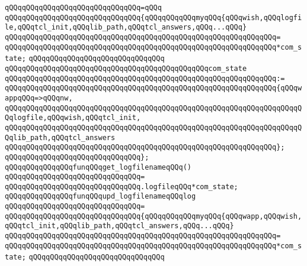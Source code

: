 \verb|qQQqqQQqqQQqqQQqqQQqqQQqqQQqqQQq=qQQq|\newline
\verb|qQQqqQQqqQQqqQQqqQQqqQQqqQQqqQQq{qQQqqQQqqQQqmyqQQq{qQQqwish,qQQqlogfile,qQQqtcl_init,qQQqlib_path,qQQqtcl_answers,qQQq...qQQq}|\newline
\verb|qQQqqQQqqQQqqQQqqQQqqQQqqQQqqQQqqQQqqQQqqQQqqQQqqQQqqQQqqQQqqQQq=|\newline
\verb|qQQqqQQqqQQqqQQqqQQqqQQqqQQqqQQqqQQqqQQqqQQqqQQqqQQqqQQqqQQqqQQq*com_state;|\newline
\verb|qQQqqQQqqQQqqQQqqQQqqQQqqQQqqQQq|\newline
\verb|qQQqqQQqqQQqqQQqqQQqqQQqqQQqqQQqqQQqqQQqqQQqqQQqcom_state|\newline
\verb|qQQqqQQqqQQqqQQqqQQqqQQqqQQqqQQqqQQqqQQqqQQqqQQqqQQqqQQqqQQqqQQq:=|\newline
\verb|qQQqqQQqqQQqqQQqqQQqqQQqqQQqqQQqqQQqqQQqqQQqqQQqqQQqqQQqqQQqqQQq{qQQqwappqQQq=>qQQqnw,|\newline
\verb|qQQqqQQqqQQqqQQqqQQqqQQqqQQqqQQqqQQqqQQqqQQqqQQqqQQqqQQqqQQqqQQqqQQqqQQqlogfile,qQQqwish,qQQqtcl_init,|\newline
\verb|qQQqqQQqqQQqqQQqqQQqqQQqqQQqqQQqqQQqqQQqqQQqqQQqqQQqqQQqqQQqqQQqqQQqqQQqlib_path,qQQqtcl_answers|\newline
\verb|qQQqqQQqqQQqqQQqqQQqqQQqqQQqqQQqqQQqqQQqqQQqqQQqqQQqqQQqqQQqqQQq};|\newline
\verb|qQQqqQQqqQQqqQQqqQQqqQQqqQQqqQQq};|\newline
\newline
\verb|qQQqqQQqqQQqqQQqfunqQQqget_logfilenameqQQq()|\newline
\verb|qQQqqQQqqQQqqQQqqQQqqQQqqQQqqQQq=|\newline
\verb|qQQqqQQqqQQqqQQqqQQqqQQqqQQqqQQq.logfileqQQq*com_state;|\newline
\newline
\verb|qQQqqQQqqQQqqQQqfunqQQqupd_logfilenameqQQqlog|\newline
\verb|qQQqqQQqqQQqqQQqqQQqqQQqqQQqqQQq=|\newline
\verb|qQQqqQQqqQQqqQQqqQQqqQQqqQQqqQQq{qQQqqQQqqQQqmyqQQq{qQQqwapp,qQQqwish,qQQqtcl_init,qQQqlib_path,qQQqtcl_answers,qQQq...qQQq}|\newline
\verb|qQQqqQQqqQQqqQQqqQQqqQQqqQQqqQQqqQQqqQQqqQQqqQQqqQQqqQQqqQQqqQQq=|\newline
\verb|qQQqqQQqqQQqqQQqqQQqqQQqqQQqqQQqqQQqqQQqqQQqqQQqqQQqqQQqqQQqqQQq*com_state;|\newline
\verb|qQQqqQQqqQQqqQQqqQQqqQQqqQQqqQQq|\newline
